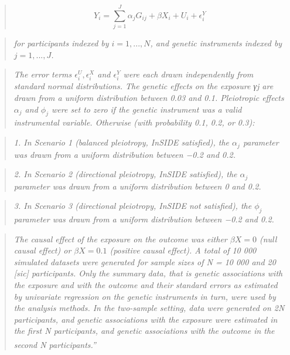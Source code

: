 \documentclass[
]{article}
\begin{document}
\begin{quote}
\begin{equation} 
Y_i = \sum^J_{j=1} \alpha_jG_{ij} + \beta X_i + U_i + \epsilon_i^Y
\end{equation}
\end{quote}

\begin{quote}
\emph{for participants indexed by \(i = 1, . . . , N\), and genetic instruments indexed by \(j = 1, . . . , J\).}
\end{quote}

\begin{quote}
\emph{The error terms \(\epsilon_i^U , \epsilon_i^X\) and \(\epsilon_i^Y\) were each drawn independently from standard normal distributions. The genetic effects on the exposure γj are drawn from a uniform distribution between 0.03 and 0.1. Pleiotropic effects \(\alpha_j\) and \(\phi_j\) were set to zero if the genetic instrument was a valid instrumental variable. Otherwise (with probability 0.1, 0.2, or 0.3):}
\end{quote}

\begin{quote}
\emph{1. In Scenario 1 (balanced pleiotropy, InSIDE satisfied), the \(\alpha_j\) parameter was drawn from a uniform distribution between −0.2 and 0.2.}
\end{quote}

\begin{quote}
\emph{2. In Scenario 2 (directional pleiotropy, InSIDE satisfied), the \(\alpha_j\) parameter was drawn from a uniform distribution between 0 and 0.2.}
\end{quote}

\begin{quote}
\emph{3. In Scenario 3 (directional pleiotropy, InSIDE not satisfied), the \(\phi_j\) parameter was drawn from a uniform distribution between −0.2 and 0.2.}
\end{quote}

\begin{quote}
\emph{The causal effect of the exposure on the outcome was either \(\beta X = 0\) (null causal effect) or \(\beta X = 0.1\) (positive causal effect). A total of 10 000 simulated datasets were generated for sample sizes of N = 10 000 and 20 {[}sic{]} participants. Only the summary data, that is genetic associations with the exposure and with the outcome and their standard errors as estimated by univariate regression on the genetic instruments in turn, were used by the analysis methods. In the two-sample setting, data were generated on 2N participants, and genetic associations with the exposure were estimated in the first N participants, and genetic associations with the outcome in the second N participants.''}\textsuperscript{}
\end{quote}
\end{document}
